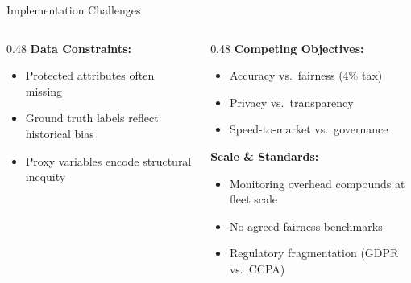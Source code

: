 \documentclass[aspectratio=169, 12pt]{beamer}
\begin{document}
\begin{frame}{Implementation Challenges}
\begin{columns}[T]
\begin{column}{0.48\textwidth}
    \vspace{0.05cm}
    \textbf{Data Constraints:}
    \begin{itemize}\setlength\itemsep{-1pt}
      \item Protected attributes often missing
      \item Ground truth labels reflect historical bias
      \item Proxy variables encode structural inequity
    \end{itemize}
  \end{column}
  \begin{column}{0.48\textwidth}
    \textbf{Competing Objectives:}
    \begin{itemize}\setlength\itemsep{-1pt}
      \item Accuracy vs.\ fairness (4\% tax)
      \item Privacy vs.\ transparency
      \item Speed-to-market vs.\ governance
    \end{itemize}

    \vspace{0.05cm}
    \textbf{Scale \& Standards:}
    \begin{itemize}\setlength\itemsep{-1pt}
      \item Monitoring overhead compounds at fleet scale
      \item No agreed fairness benchmarks
      \item Regulatory fragmentation (GDPR vs.\ CCPA)
    \end{itemize}
  \end{column}
\end{columns}

\end{frame}
\end{document}
